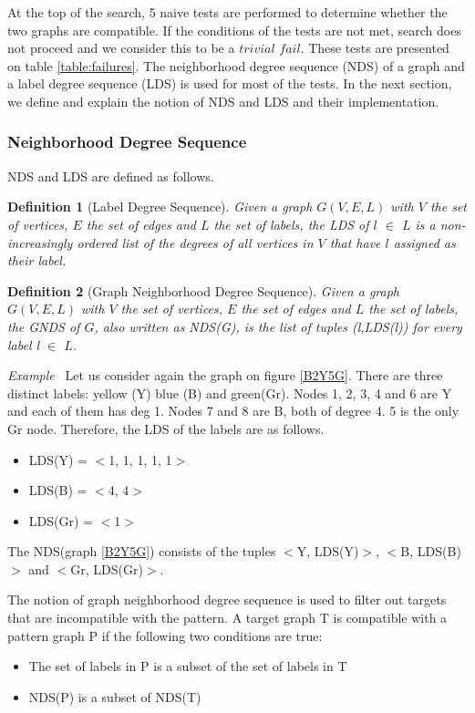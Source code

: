\documentclass{l4proj}
\newcounter{example}[section]
\newenvironment{example}[1][]{\refstepcounter{example}\par\medskip
   \noindent \textit{Example~\theexample #1} \rmfamily}{\medskip}
\newtheorem{definition}{Definition}
\begin{document}
At the top of the search, 5 naive tests are performed to determine whether the two graphs are compatible. If the conditions of the tests are not met, search does not proceed and we consider this to be a $trivial$ $fail$. These tests are presented on table \ref{table:failures}. The neighborhood degree sequence (NDS) of a graph and a label degree sequence (LDS) is used for most of the tests. In the next section, we define and explain the notion of NDS and LDS and their implementation.

\subsubsection{Neighborhood Degree Sequence}
NDS and LDS are defined as follows.

\begin{definition}[Label Degree Sequence]
Given a graph $G(V,E,L)$ with $V$ the set of vertices, $E$ the set of edges and $L$ the set of labels, the LDS of $l$ $\in$ $L$ is a non-increasingly ordered list of the degrees of all vertices in $V$ that have $l$ assigned as their label.    
\end{definition}

\begin{definition}[Graph Neighborhood Degree Sequence]
Given a graph $G(V,E,L)$ with $V$ the set of vertices, $E$ the set of edges and $L$ the set of labels, the GNDS of $G$,  also written as NDS(G), is the list of tuples (l,LDS(l)) for every label l $\in$ $L$.
\end{definition}

\begin{example}
Let us consider again the graph on figure \ref{B2Y5G}. There are three distinct labels: yellow (Y) blue (B) and green(Gr). Nodes 1, 2, 3, 4 and 6 are Y and each of them has deg 1. Nodes 7 and 8 are B, both of degree 4. 5 is the only Gr node. Therefore, the LDS of the labels are as follows.
\begin{itemize}
\item LDS(Y) = $<$1, 1, 1, 1, 1$>$
\item LDS(B) = $<$4, 4$>$
\item LDS(Gr) = $<$1$>$
\end{itemize}
The NDS(graph \ref{B2Y5G}) consists of the tuples $<$Y, LDS(Y)$>$, $<$B, LDS(B)$>$ and $<$Gr, LDS(Gr)$>$. 
\end{example}

The notion of graph neighborhood degree sequence is used to filter out targets that are incompatible with the pattern. A target graph T is compatible with a pattern graph P if the following two conditions are true:
\begin{itemize}
\item The set of labels in P is a subset of the set of labels in T
\item NDS(P) is a subset of NDS(T)
\end{itemize}
\end{document}
